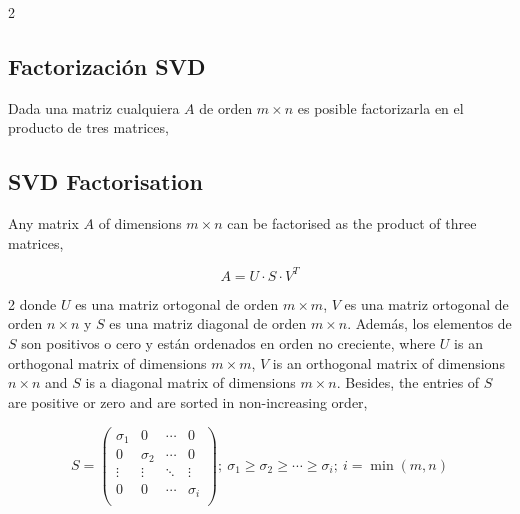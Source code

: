 \begin{paracol}{2}
\subsection{Factorización SVD}\label{sec:SVD}
Dada una matriz cualquiera $A$ de orden $m\times n$ es posible factorizarla en el producto de tres matrices,
\switchcolumn
\subsection{SVD Factorisation}\label{sec:SVD-2}
Any matrix $A$ of dimensions $m \times n$ can be factorised as the product of three matrices,
\end{paracol}
\begin{equation*}
A=U\cdot S \cdot V^T 
\end{equation*}
\begin{paracol}{2}
donde $U$ es una matriz ortogonal de orden $m\times m$, $V$ es una matriz ortogonal de orden $n\times n$ y $S$ es una matriz diagonal de orden $m\times n$. Además, los elementos de $S$ son positivos o cero y están ordenados en orden no creciente,
\switchcolumn
where $U$ is an orthogonal matrix of dimensions $m\times m$, $V$ is an orthogonal matrix of dimensions $n\times n$ and $S$ is a diagonal matrix of dimensions $m \times n$. Besides, the entries of $S$ are positive or zero and are sorted in non-increasing order, 
\end{paracol}
\begin{equation*}
S=\begin{pmatrix}
\sigma_1& 0& \cdots & 0\\
0 & \sigma_2& \cdots & 0\\
\vdots & \vdots & \ddots & \vdots \\
0& 0& \cdots & \sigma_i\\ 
\end{pmatrix}; \ \sigma_1 \geq \sigma_2 \geq \cdots \geq \sigma_i; \ i=\min(m,n)
\end{equation*}

